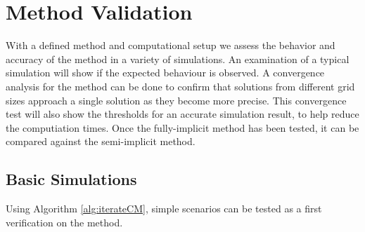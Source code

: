 \section{Method Validation}

  With a defined method and computational setup we assess the behavior and accuracy of the method in a variety of simulations.
  An examination of a typical simulation will show if the expected behaviour is observed.
  A convergence analysis for the method can be done to confirm that solutions from different grid sizes approach a single solution as they become more precise.
  This convergence test will also show the thresholds for an accurate simulation result, to help reduce the computiation times.
  Once the fully-implicit method has been tested, it can be compared against the semi-implicit method.

\subsection{Basic Simulations}

  Using Algorithm \ref{alg:iterateCM}, simple scenarios can be tested as a first verification on the method.

  

